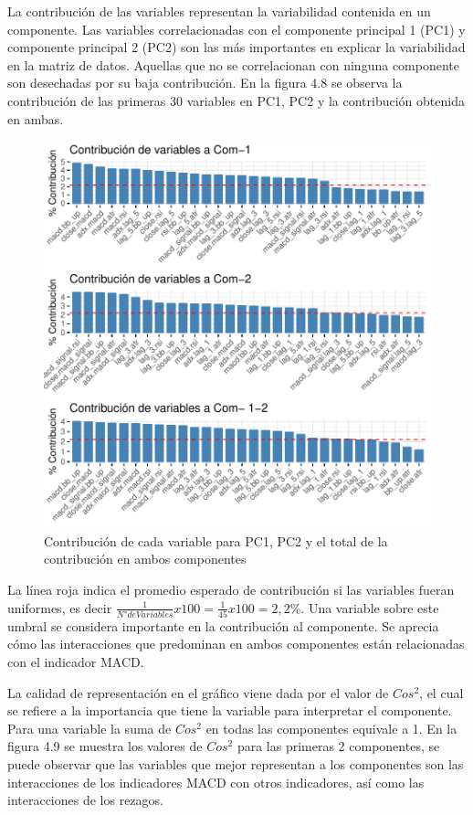\documentclass[a4paper,12pt]{Latex/Classes/PhDthesisPSnPDF}
\begin{document}
La contribución de las variables representan la variabilidad contenida en un componente. Las variables correlacionadas con el componente principal 1 (PC1) y componente principal 2 (PC2) son las más importantes en explicar la variabilidad en la matriz de datos. Aquellas que no se correlacionan con ninguna componente son desechadas por su baja contribución. En la figura 4.8 se observa la contribución de las primeras 30 variables en PC1, PC2 y la contribución obtenida en ambas.

\begin{figure}[H]
\centering
\includegraphics{main-014}
\caption{Contribución de cada variable para PC1, PC2 y el total de la contribución en ambos componentes}
\end{figure}

La línea roja indica el promedio esperado de contribución si las variables fueran uniformes, es decir $ \frac{1}{N° de Variables}x100 = \frac{1}{45}x100 = 2,2\%$. Una variable sobre este umbral se considera importante en la contribución al componente. Se aprecia cómo las interacciones que predominan en ambos componentes están relacionadas con el indicador MACD.

La calidad de representación en el gráfico viene dada por el valor de $Cos^2$, el cual se refiere a la importancia que tiene la variable para interpretar el componente. Para una variable la suma de $Cos^2$ en todas las componentes equivale a 1. En la figura 4.9 se muestra los valores de $Cos^2$ para las primeras 2 componentes, se puede observar que las variables que mejor representan a los componentes son las interacciones de los indicadores MACD con otros indicadores, así como las interacciones de los rezagos.
\end{document}
